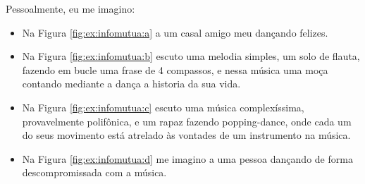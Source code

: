 Pessoalmente, eu me imagino:
\begin{itemize}
\item Na Figura \ref{fig:ex:infomutua:a} a um casal amigo meu dançando felizes.
\item Na Figura \ref{fig:ex:infomutua:b} escuto uma melodia simples, um solo de flauta,
fazendo em bucle uma frase de 4 compassos, 
e nessa música uma moça contando mediante a dança a historia da sua vida.
\item Na Figura \ref{fig:ex:infomutua:c} escuto uma música complexíssima, 
provavelmente polifônica, e um rapaz fazendo popping-dance,
onde cada um do seus movimento está atrelado às vontades de um instrumento na música.
\item Na Figura \ref{fig:ex:infomutua:d} me imagino a uma pessoa dançando de forma descompromissada com a música.
\end{itemize}

